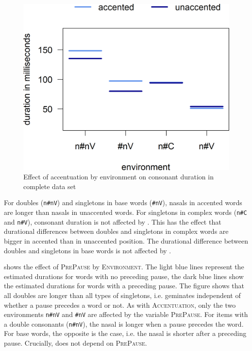 \begin{figure}
\includegraphics [scale=0.5] {images/Experiment/unModelCompleteInterEnvAcc}
\caption{Effect of accentuation by environment on consonant duration in complete data set\label{fig:NumNasal Acc un experiment}}
\end{figure}


 For  doubles (\texttt{n\#nV}) and singletons in base words (\texttt{\#nV}), nasals in accented words are longer than nasals in unaccented words.
For singletons in complex words (\texttt{n\#C} and \texttt{n\#V}), consonant duration is not affected by . This has the effect that durational differences between doubles and singletons in complex words are bigger in accented than in unaccented position. The durational difference between doubles and singletons in base words is not affected by .

 shows the effect of \textsc{PrePause} by \textsc{Environment}. The light blue lines represent the estimated durations for words with no preceding pause, the dark blue lines show the estimated durations for words with a preceding pause. 
The figure shows that all doubles are longer than all types of singletons, i.e.  geminates independent of whether a pause precedes a word or not.
As with \textsc{Accentuation}, only the two environments \texttt{n\#nV} and \texttt{\#nV} are affected by the variable \textsc{PrePause}. For items with a double consonants (\texttt{n\#nV}), the nasal is longer when a pause precedes the word. For base words, the opposite is the case, i.e. the nasal is shorter after a preceding pause.
Crucially,  does not depend on \textsc{PrePause}. 

